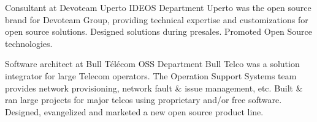\documentclass[12pt,a4paper]{moderncv}
\begin{document}
        {Consultant at Devoteam Uperto}
        {IDEOS Department}{}{}
{Uperto was the open source brand for Devoteam Group, providing technical
  expertise and customizations for open source solutions.}
{Designed solutions during presales. Promoted Open Source technologies.}

        {Software architect at Bull Télécom}
        {OSS Department}{}{}
{Bull Telco was a solution integrator for large Telecom operators.
  The Operation Support Systems team provides
  network provisioning, network fault \& issue management, etc.}
{Built \& ran large projects for major telcos using proprietary and/or free software.
  Designed, evangelized and marketed a new open source product line.}





\end{document}
